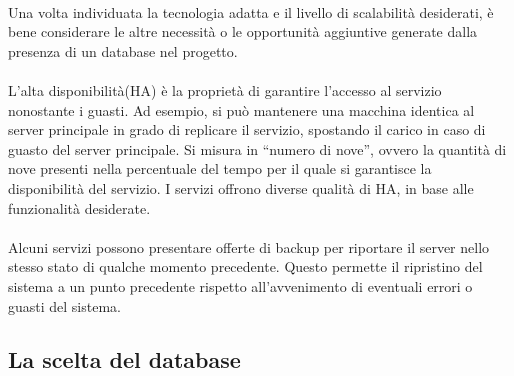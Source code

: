 \\
Una volta individuata la tecnologia adatta e il livello di scalabilità desiderati,
è bene considerare le altre necessità o le opportunità aggiuntive generate
dalla presenza di un database nel progetto. \\
\\
L’alta disponibilità(HA) è la proprietà di garantire l’accesso al servizio nonostante i guasti.
Ad esempio, si può mantenere una macchina identica al server principale in grado di replicare il servizio,
spostando il carico in caso di guasto del server principale.
Si misura in “numero di nove”, ovvero la quantità di nove presenti
nella percentuale del tempo per il quale si garantisce la disponibilità del servizio.
I servizi offrono diverse qualità di HA, in base alle funzionalità desiderate.\\
\\
Alcuni servizi possono presentare offerte di backup
per riportare il server nello stesso stato di qualche momento precedente.
Questo permette il ripristino del sistema a un punto precedente
rispetto all'avvenimento di eventuali errori o guasti del sistema.\\
\subsection{La scelta del database}

